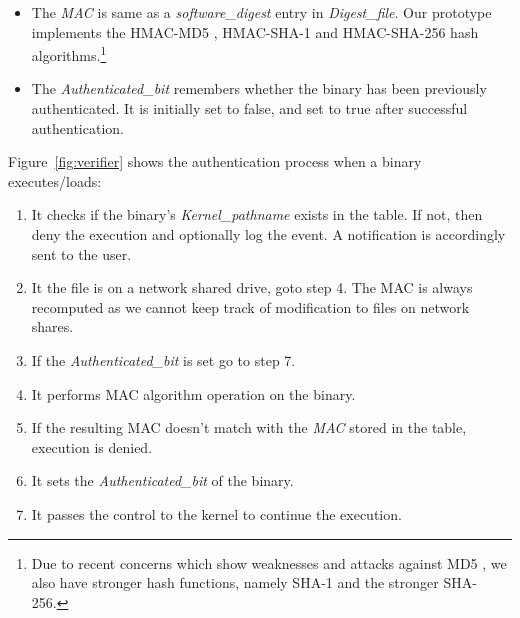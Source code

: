 \begin{itemize}
\item The {\it MAC} is same as a {\it software\_digest} entry in {\it Digest\_file}.
Our prototype implements the
HMAC-MD5 \cite{krawczyk1997rfc2104}, HMAC-SHA-1 
and HMAC-SHA-256 \cite{eastlake2006rfc4634} hash algorithms.\footnote{
Due to recent concerns which show weaknesses and attacks against MD5 \cite{wang2005break}, 
we also have stronger hash functions, namely SHA-1 and the stronger SHA-256.}
\item The {\it Authenticated\_bit} remembers whether the binary has
been previously authenticated.
It is initially set to false, and set to true after successful authentication.
\end{itemize}

\noindent
Figure~\ref{fig:verifier} shows the authentication process
when a binary executes/loads:
\begin{enumerate}
\item It checks if the binary's {\it Kernel\_pathname} exists in the table.
If not, then deny the execution and optionally log the event.
A notification is accordingly sent to the user. 
\item It the file is on a network shared drive, goto step 4.
The MAC is always
recomputed as we cannot keep track of modification to files on network shares.
\item If the {\it Authenticated\_bit} is set go to step 7.
\item It performs MAC algorithm operation on the binary.
\item If the resulting MAC doesn't match with the 
{\it MAC} stored in the table, execution is denied.
\item It sets the {\it Authenticated\_bit} of the binary.
\item It passes the control to the kernel to continue the execution.
\end{enumerate}

